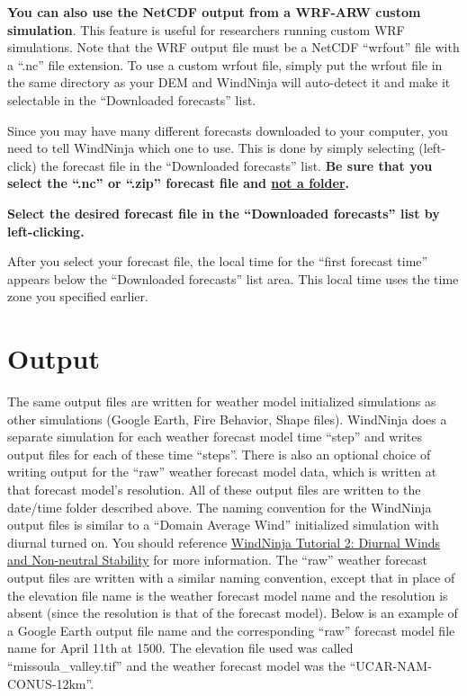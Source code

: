 \documentclass[12pt]{article}
\begin{document}
\textbf{You can also use the NetCDF output from a WRF-ARW custom simulation}. This feature is useful for researchers running custom WRF simulations. Note that the WRF output file must be a NetCDF “wrfout” file with a “.nc” file extension. To use a custom wrfout file, simply put the wrfout file in the same directory as your DEM and WindNinja will auto-detect it and make it selectable in the “Downloaded forecasts” list.

Since you may have many different forecasts downloaded to your computer, you need to tell WindNinja which one to use.  This is done by simply selecting (left-click) the forecast file in the “Downloaded forecasts” list.  \textbf{Be sure that you select the “.nc” or “.zip” forecast file and \underline{not a folder}.}

\textbf{\color{red}Select the desired forecast file in the “Downloaded forecasts” list by left-clicking.}

After you select your forecast file, the local time for the “first forecast time” appears below the “Downloaded forecasts” list area.  This local time uses the time zone you specified earlier.

\section{Output}
The same output files are written for weather model initialized simulations as other simulations (Google Earth, Fire Behavior, Shape files).  WindNinja does a separate simulation for each weather forecast model time “step” and writes output files for each of these time “steps”.  There is also an optional choice of writing output for the “raw” weather forecast model data, which is written at that forecast model's resolution.  All of these output files are written to the date/time folder described above.  The naming convention for the WindNinja output files is similar to a “Domain Average Wind” initialized simulation with diurnal turned on.  You should reference \href{http://firelab.github.io/windninja/pdf/WindNinja_tutorial2.pdf}{WindNinja Tutorial 2: Diurnal Winds and Non-neutral Stability} for more information.  The “raw” weather forecast output files are written with a similar naming convention, except that in place of the elevation file name is the weather forecast model name and the resolution is absent (since the resolution is that of the forecast model).  Below is an example of a Google Earth output file name and the corresponding “raw” forecast model file name for April 11th at 1500.  The elevation file used was called “missoula\_valley.tif” and the weather forecast model was the “UCAR-NAM-CONUS-12km”.
\end{document}
